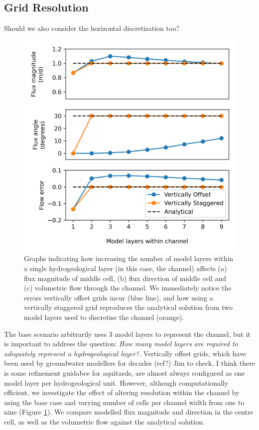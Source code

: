 \documentclass{article}
\begin{document}
\subsection{Grid Resolution}

{\color{red} Should we also consider the horizontal discretisation too?}

\begin{figure}
	\begin{center}
	\includegraphics[scale=0.9]{../figures/fig3paper.png}
	\caption{Graphs indicating how increasing the number of model layers within a single hydrogeological layer (in this case, the channel) affects (a) flux magnitude of middle cell, (b) flux direction of middle cell and (c) volumetric flow through the channel. We immediately notice the errors vertically offset grids incur (blue line), and how using a vertically staggered grid reproduces the analytical solution from two model layers used to discretise the channel (orange).}
	\label{fig:fig3}
	\end{center}
\end{figure}

The base scenario arbitrarily uses 3 model layers to represent the channel, but it is important to address the question: \emph{How many model layers are required to adequately represent a hydrogeological layer?}. Vertically offset grids, which have been used by groundwater modellers for decades (ref?) {\color{red} Jim to check, I think there is some refinement guidabce for aquitards}, are almost always configured as one model layer per hydrogeological unit. However, although computationally efficient, we investigate the effect of altering resolution within the channel by using the base case and varying number of cells per channel width from one to nine (Figure \ref{fig:fig3}). We compare modelled flux magnitude and direction in the centre cell, as well as the volumetric flow against the analytical solution.
\end{document}
